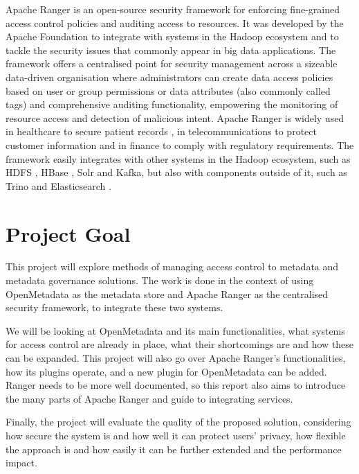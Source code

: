 Apache Ranger \cite{apacheRangerAccessControlModelGuptaMaanak2017,apacheRangerMultiLayerdGuptaMaanak2017} is an open-source security framework for enforcing fine-grained access control policies and auditing access to resources. It was developed by the Apache Foundation to integrate with systems in the Hadoop ecosystem and to tackle the security issues that commonly appear in big data applications. The framework offers a centralised point for security management across a sizeable data-driven organisation where administrators can create data access policies based on user or group permissions or data attributes (also commonly called tags) and comprehensive auditing functionality, empowering the monitoring of resource access and detection of malicious intent. Apache Ranger is widely used in healthcare 
to secure patient records \cite{rangerHealhcareRangarajan2018}, in telecommunications to protect customer information \cite{rangerTelecomAhmad2019} and in finance to comply with regulatory requirements. The framework easily integrates with other systems in the Hadoop ecosystem, such as HDFS \cite{HDFSBorthakur2008}, HBase \cite{apacheHbaseTech}, Solr \cite{apacheSolrTech} and Kafka, but also with components outside of it, such as Trino and Elasticsearch \cite{elasticsearchTech}.

\section{\label{sec:project_goal} Project Goal}

This project will explore methods of managing access control to metadata and metadata governance solutions. The work is done in the context of using OpenMetadata as the metadata store and Apache Ranger as the centralised security framework, to integrate these two systems.

We will be looking at OpenMetadata and its main functionalities, what systems for access control are already in place, what their shortcomings are and how these can be expanded. This project will also go over Apache Ranger's functionalities, how its plugins operate, and a new plugin for OpenMetadata can be added. Ranger needs to be more well documented, so this report also aims to introduce the many parts of Apache Ranger and guide to integrating services.

Finally, the project will evaluate the quality of the proposed solution, considering how secure the system is and how well it can protect users' privacy, how flexible the approach is and how easily it can be further extended and the performance impact.


